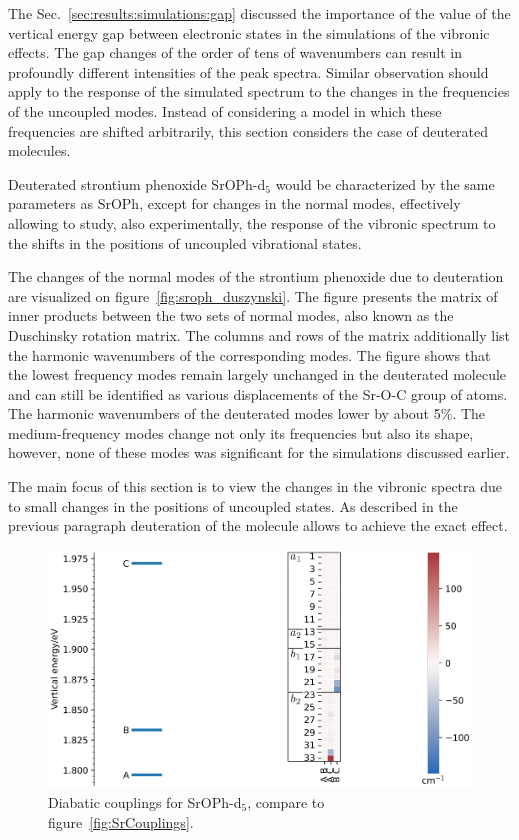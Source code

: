 \documentclass{article}
\begin{document}
The Sec.~\ref{sec:results:simulations:gap} discussed the importance of the
value of the vertical energy gap between electronic states in the simulations
of the vibronic effects. The gap changes of the order of tens of wavenumbers
can result in profoundly different intensities of the peak spectra. Similar
observation should apply to the response of the simulated spectrum to the
changes in the frequencies of the uncoupled modes. Instead of considering a
model in which these frequencies are shifted arbitrarily, this section
considers the case of deuterated molecules.

Deuterated strontium phenoxide SrOPh-d$_5$ would be characterized by the same
parameters as SrOPh, except for changes in the normal modes, effectively
allowing to study, also experimentally, the response of the vibronic spectrum
to the shifts in the positions of uncoupled vibrational states.

The changes of the normal modes of the strontium phenoxide due to deuteration
are visualized on figure~\ref{fig:sroph_duszynski}. The figure presents the
matrix of inner products between the two sets of normal modes, also known as
the Duschinsky rotation matrix. The columns and rows of the matrix additionally
list the harmonic wavenumbers of the corresponding modes. The figure shows
that the lowest frequency modes remain largely unchanged in the deuterated
molecule and can still be identified as various displacements of the Sr-O-C
group of atoms. The harmonic wavenumbers of the deuterated modes lower by
about 5\%. The medium-frequency modes change not only its frequencies but also
its shape, however, none of these modes was significant for the simulations
discussed earlier.

The main focus of this section is to view the changes in the vibronic spectra
due to small changes in the positions of uncoupled states. As described in the
previous paragraph deuteration of the molecule allows to achieve the exact
effect.

\begin{figure}
    \begin{center}
        \includegraphics[width=12 cm]{./figures/SrOPh5dCouplings.pdf}
    \end{center}
    \caption{
        Diabatic couplings for SrOPh-d$_5$, compare to
        figure~\ref{fig:SrCouplings}.
    }
    \label{fig:srd5_couplings}
\end{figure}
\end{document}

